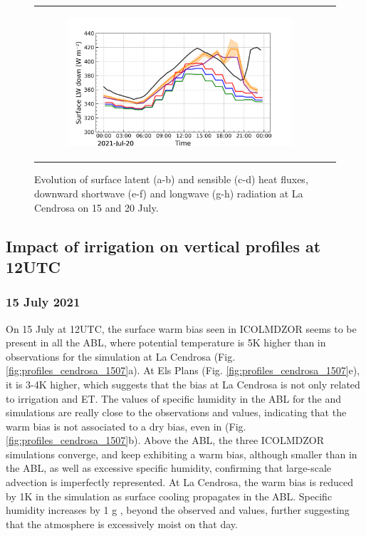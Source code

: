 \begin{figure}[hbtp]
\begin{tabular}{cc}
\begin{subfigure}[t]{0.5\textwidth}
            \includegraphics[width=\textwidth]{images/chap6/IOP_TS/TS_2021-07-20_cendrosa_LWdnSFC.png}
        \end{subfigure}
    \end{tabular}
    \caption{Evolution of surface latent (a-b) and sensible (c-d) heat fluxes, downward shortwave (e-f) and longwave (g-h) radiation at La Cendrosa on 15 and 20 July.}
    \label{fig:iop_days_TS_energy}
\end{figure}

\clearpage

\subsection{Impact of irrigation on vertical profiles at 12UTC}
\label{sec:vertical_profiles}

\subsubsection*{15 July 2021}
On 15 July at 12UTC, the surface warm bias seen in ICOLMDZOR seems to be present in all the ABL, where potential temperature is 5K higher than in observations for the \noirr simulation at La Cendrosa (Fig. \ref{fig:profiles_cendrosa_1507}a). 
At Els Plans (Fig. \ref{fig:profiles_cendrosa_1507}e), it is 3-4K higher, which suggests that the bias at La Cendrosa is not only related to irrigation and ET. 
The values of specific humidity in the ABL for the \noirr and \irr simulations are really close to the observations and \mesomean values, indicating that the warm bias is not associated to a dry bias, even in \noirr (Fig. \ref{fig:profiles_cendrosa_1507}b).
Above the ABL, the three ICOLMDZOR simulations converge, and keep exhibiting a warm bias, although smaller than in the ABL, as well as excessive specific humidity, confirming that large-scale advection is imperfectly represented.
At La Cendrosa, the warm bias is reduced by 1K in the \irrboost simulation as surface cooling propagates in the ABL. Specific humidity increases by 1 g \perkg, beyond the observed and \mesomean values, further suggesting that the atmosphere is excessively moist on that day.

